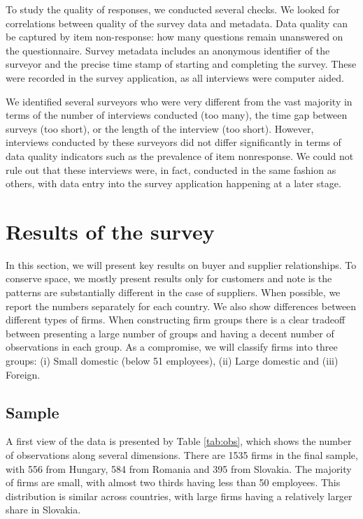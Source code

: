 \usepackage{}\documentclass[final, dvipsnames, authoryear,12pt]{elsarticle}
\begin{document}
To study the quality of responses, we conducted several checks. We looked for correlations between quality of the survey data and metadata. Data quality can be captured by item non-response: how many questions remain unanswered on the questionnaire. Survey metadata includes an anonymous identifier of the surveyor and the precise time stamp of starting and completing the survey. These were recorded in the survey application, as all interviews were computer aided. 

We identified several surveyors who were very different from the vast majority in terms of the number of interviews conducted (too many), the time gap between surveys (too short), or the length of the interview (too short). However, interviews conducted by these surveyors did not differ significantly in terms of data quality indicators such as the prevalence of item nonresponse. We could not rule out that these interviews were, in fact, conducted in the same fashion as others, with data entry into the survey application happening at a later stage.


\section{Results of the survey}
\label{sec:desc}

In this section, we will present key results on buyer and supplier relationships. To conserve space, we mostly present results only for customers and note is the patterns are substantially different in the case of suppliers. When possible, we report the numbers separately for each country. We also show differences between different types of firms. When constructing firm groups there is a clear tradeoff between presenting a large number of groups and having a decent number of observations in each group. As a compromise, we will classify firms into three groups: (i) Small domestic (below 51 employees), (ii) Large domestic and (iii) Foreign. 



\subsection{Sample}


A first view of the data is presented by Table \ref{tab:obs}, which shows the number of observations along several dimensions. There are 1535 firms in the final sample, with 556 from Hungary, 584 from Romania and 395 from Slovakia. The majority of firms are small, with almost two thirds having less than 50 employees. This distribution is similar across countries, with large firms having a relatively larger share in Slovakia.
\end{document}
